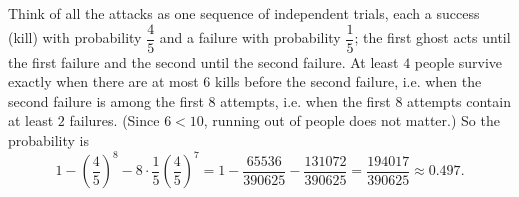 Think of all the attacks as one sequence of independent trials, each a success (kill) with probability $\dfrac45$ and a failure with probability $\dfrac15$; the first ghost acts until the first failure and the second until the second failure. At least $4$ people survive exactly when there are at most $6$ kills before the second failure, i.e. when the second failure is among the first $8$ attempts, i.e. when the first $8$ attempts contain at least $2$ failures. (Since $6<10$, running out of people does not matter.) So the probability is
\[1-\left(\dfrac45\right)^8-8\cdot\dfrac15\left(\dfrac45\right)^7=1-\dfrac{65536}{390625}-\dfrac{131072}{390625}=\boxed{\dfrac{194017}{390625}}\approx0.497.\]

